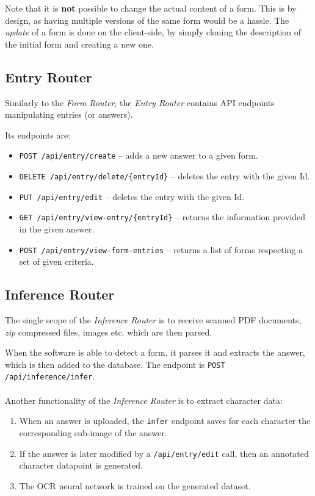 \documentclass[11pt, a4paper]{report}
\def\code#1{\texttt{#1}}
\begin{document}
Note that it is \textbf{not} possible to change the actual content of a form. This is by design, as having multiple versions of the same form would be a hassle. The \textit{update} of a form is done on the client-side, by simply cloning the description of the initial form and creating a new one.

\subsection{Entry Router}

Similarly to the \textit{Form Router}, the \textit{Entry Router} contains API endpoints manipulating entries (or answers).

Its endpoints are:
\begin{itemize}
    \item \code{POST /api/entry/create} -- adds a new answer to a given form.
    \item \code{DELETE /api/entry/delete/\{entryId\}} -- deletes the entry with the given Id.
    \item \code{PUT /api/entry/edit} -- deletes the entry with the given Id.
    \item \code{GET /api/entry/view-entry/\{entryId\}} -- returns the information provided in the given answer.
    \item \code{POST /api/entry/view-form-entries} -- returns a list of forms respecting a set of given criteria.
\end{itemize}

\subsection{Inference Router}

The single scope of the \textit{Inference Router} is to receive scanned PDF documents, \textit{zip} compressed files, images etc. which are then parsed.

When the software is able to detect a form, it parses it and extracts the answer, which is then added to the database. The endpoint is \code{POST /api/inference/infer}.
\\ \\
Another functionality of the \textit{Inference Router} is to extract character data:
\begin{enumerate}
    \item When an answer is uploaded, the \code{infer} endpoint saves for each character the corresponding sub-image of the answer.
    \item If the answer is later modified by a \code{/api/entry/edit} call, then an annotated character datapoint is generated.
    \item The OCR neural network is trained on the generated dataset.
\end{enumerate}
\end{document}
